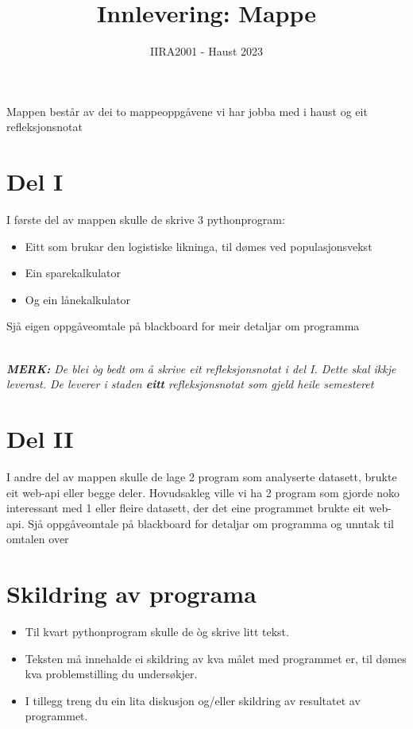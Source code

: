 \documentclass[12pt, titlepage]{article}
\begin{document}
\title{Innlevering: Mappe}
\author{IIRA2001 - Haust 2023}
\date{}
\maketitle

Mappen består av dei to mappeoppgåvene vi har jobba med i haust og eit refleksjonsnotat

\section*{Del I}

I første del av mappen skulle de skrive 3 pythonprogram:
\begin{itemize}
   \item {Eitt som brukar den logistiske likninga, til dømes ved populasjonsvekst}
   \item {Ein sparekalkulator}
   \item {Og ein lånekalkulator}
\end{itemize}
Sjå eigen oppgåveomtale på blackboard for meir detaljar om programma

~\\
\textit{\textbf{MERK:} De blei òg bedt om å skrive eit refleksjonsnotat i del I. Dette skal ikkje leverast.
De leverer i staden \textbf{eitt} refleksjonsnotat som gjeld heile semesteret}

\section*{Del II}

I andre del av mappen skulle de lage 2 program som analyserte datasett, brukte eit web-api eller begge deler.
Hovudsakleg ville vi ha 2 program som gjorde noko interessant med 1 eller fleire datasett, der det eine programmet brukte eit web-api.
Sjå oppgåveomtale på blackboard for detaljar om programma og unntak til omtalen over

\section*{Skildring av programa}

\begin{itemize}
   \item{Til kvart pythonprogram skulle de òg skrive litt tekst. }
   \item {Teksten må innehalde ei skildring av kva målet med programmet er, til dømes kva problemstilling du undersøkjer.}
   \item {I tillegg treng du ein lita diskusjon og/eller skildring av resultatet av programmet. }
\end{itemize}
\end{document}
